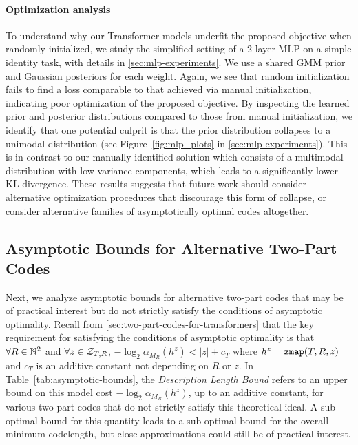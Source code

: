 \paragraph{Optimization analysis} To understand why our Transformer models underfit the proposed objective when randomly initialized, we study the simplified setting of a 2-layer MLP on a simple identity task, with details in \ref{sec:mlp-experiments}. We use a shared GMM prior and Gaussian posteriors for each weight. 
Again, we see that random initialization fails to find a loss comparable to that achieved via manual initialization, indicating poor optimization of the proposed objective. By inspecting the learned prior and posterior distributions compared to those from manual initialization, we identify that one potential culprit is that the prior distribution collapses to a unimodal distribution (see Figure~\ref{fig:mlp_plots} in \ref{sec:mlp-experiments}). This is in contrast to our manually identified solution which consists of a multimodal distribution with low variance components, which leads to a significantly lower KL divergence. 
These results suggests that future work should consider alternative optimization procedures that discourage this form of collapse, or consider alternative families of asymptotically optimal codes altogether. 

\subsection{Asymptotic Bounds for Alternative Two-Part Codes}
\label{sec:asymptotic-bounds}

Next, we analyze asymptotic bounds for alternative two-part codes that may be of practical interest but do not strictly satisfy the conditions of asymptotic optimality. Recall from \ref{sec:two-part-codes-for-transformers} that the key requirement for satisfying the conditions of asymptotic optimality is that $\forall R \in {\mathbb{N}^2}$ and $\forall z \in {\mathcal{Z}}_{T,R}$, $-\log_2 \alpha_{M_R}(h^z) < |z| + c_T$ where $h^z = \texttt{zmap}(T,R,z)$ and $c_T$ is an additive constant not depending on $R$ or $z$. %
In Table~\ref{tab:asymptotic-bounds}, the \emph{Description Length Bound} refers to an upper bound on this model cost $-\log_2 \alpha_{M_R}(h^z)$, up to an additive constant, for various two-part codes that do not strictly satisfy this theoretical ideal. A sub-optimal bound for this quantity leads to a sub-optimal bound for the overall minimum codelength, %
but close approximations could still be of practical interest. 



